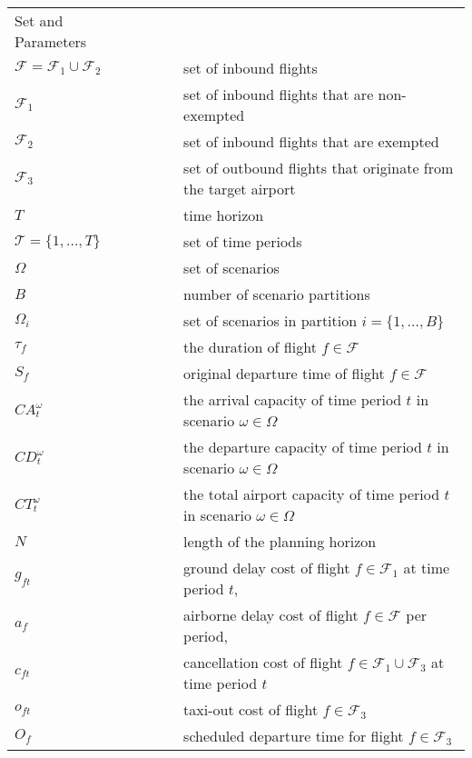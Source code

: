 \documentclass[12pt]{article}
\begin{document}
	\begin{longtable}[H]{l l l}
		Set and Parameters & &\\
		\(\mathcal{F} = \mathcal{F}_1 \cup \mathcal{F}_2\) & \(\qquad\)& set of inbound flights\\
		\(\mathcal{F}_1\) & \(\qquad\)& set of inbound flights that are non-exempted\\
		\(\mathcal{F}_2\) & \(\qquad\)& set of inbound flights that are exempted\\
		\(\mathcal{F}_3\) & \(\qquad\)& set of outbound flights that originate from the target airport\\
		\(T\) & \(\qquad\) & time horizon\\
		\(\mathcal{T} = \{1, \dots,T\}\) & \(\qquad\) & set of time periods\\
		\(\Omega\) & \(\qquad\) & set of scenarios\\
		\(B\) & \(\qquad\) & number of scenario partitions \\
		\(\Omega_i\) & \(\qquad\) & set of scenarios in partition \(i = \{1, \dots, B\}\)\\
		\(\tau_f\) & \(\qquad\) & the duration of flight \(f \in \mathcal{F}\)\\
		\(S_f\) & \(\qquad\) & original departure time of flight \(f\in \mathcal{F}\)\\
		\(CA_t^\omega\)  & \(\qquad\) & the arrival capacity of time period \(t\) in scenario \(\omega \in \Omega\)\\
		\(CD_t^\omega\)  & \(\qquad\) & the departure capacity of time period \(t\) in scenario \(\omega \in \Omega\)\\
		\(CT_t^\omega\)  & \(\qquad\) & the total airport capacity of time period \(t\) in scenario \(\omega \in \Omega\)\\
		\(N\) & \(\qquad\) & length of the planning horizon \\
		\(g_{ft}\) & \(\qquad\) & ground delay cost of flight \(f \in \mathcal{F}_1\) at time period \(t\), \\
		\(a_{f}\) & \(\qquad\) & airborne delay cost of flight \(f \in \mathcal{F}\) per period, \\
		\(c_{ft}\) & \(\qquad\) & cancellation cost of flight \(f \in \mathcal{F}_1 \cup \mathcal{F}_3\) at time period \(t\)\\
		\(o_{ft}\) & \(\qquad\) & taxi-out cost of flight \(f \in \mathcal{F}_3\)\\
		\(O_{f}\) & \(\qquad\) & scheduled departure time for flight \(f \in \mathcal{F}_3\)\\
	\end{longtable}
\end{document}
